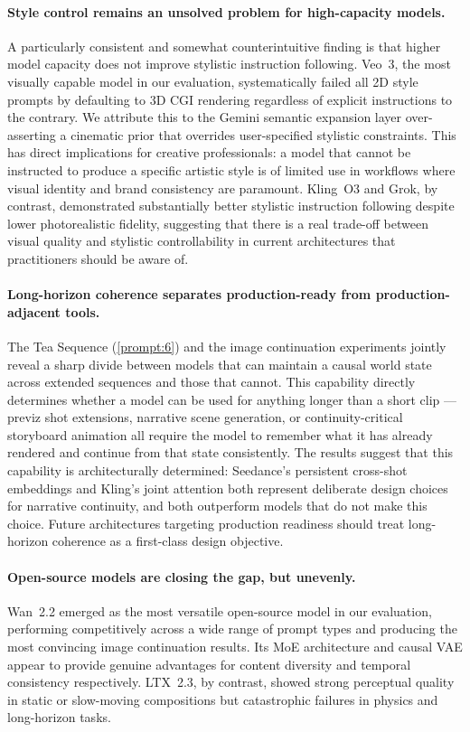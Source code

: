 \documentclass[sigconf]{acmart}
\begin{document}
\paragraph{Style control remains an unsolved problem for high-capacity models.}
A particularly consistent and somewhat counterintuitive finding is
that higher model capacity does not improve stylistic instruction
following. Veo~3, the
most visually capable model in our evaluation, systematically
failed all 2D style prompts by defaulting to 3D
CGI rendering regardless of explicit instructions to the contrary.
We attribute this to the Gemini semantic expansion layer
over-asserting a cinematic prior that overrides user-specified
stylistic constraints. This has direct implications for creative
professionals: a model that cannot be instructed to produce a
specific artistic style is of limited use in workflows where
visual identity and brand consistency are paramount. Kling~O3
and Grok, by contrast, demonstrated substantially better
stylistic instruction following despite lower photorealistic
fidelity, suggesting that there is a real trade-off between
visual quality and stylistic controllability in current
architectures that practitioners should be aware of.

\paragraph{Long-horizon coherence separates production-ready from
    production-adjacent tools.}
The Tea Sequence (\ref{prompt:6}) and the image continuation
experiments jointly reveal a sharp divide between models that can
maintain a causal world state across extended sequences and those
that cannot. This
capability directly determines whether a model can be used for
anything longer than a short clip — previz shot extensions,
narrative scene generation, or continuity-critical storyboard
animation all require the model to remember what it has already
rendered and continue from that state consistently. The results
suggest that this capability is architecturally determined:
Seedance's persistent cross-shot embeddings and Kling's joint
attention both represent deliberate design choices for narrative
continuity, and both outperform models that do not make this choice.
Future architectures targeting production readiness should treat
long-horizon coherence as a first-class design objective.

\paragraph{Open-source models are closing the gap, but unevenly.}
Wan~2.2 emerged as the most versatile open-source model in our
evaluation, performing competitively across a wide range of prompt
types and producing the most convincing image continuation results.
Its MoE architecture and causal VAE appear to provide genuine
advantages for content diversity and temporal consistency
respectively. LTX~2.3, by contrast, showed strong perceptual
quality in static or slow-moving compositions but catastrophic
failures in physics and long-horizon tasks.
\end{document}
